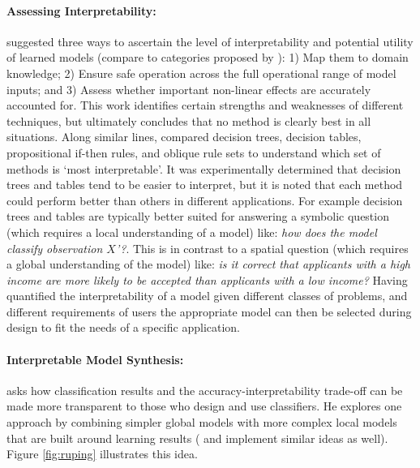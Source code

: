\paragraph{Assessing Interpretability:}
\citet{Van_Belle2013-ph} suggested three ways to ascertain the level of interpretability and potential utility of learned models (compare to categories proposed by \citet{Lipton2016-ug}): 1) Map them to domain knowledge; 2) Ensure safe operation across the full operational range of model inputs; and 3) Assess whether important non-linear effects are accurately accounted for. This work identifies certain strengths and weaknesses of different techniques, but ultimately concludes that no method is clearly best in all situations. 
%
Along similar lines, \citet{Huysmans2011-th} compared decision trees, decision tables, propositional if-then rules, and oblique rule sets to understand which set of methods is `most interpretable'. It was experimentally determined that decision trees and tables tend to be easier to interpret, but it is noted that each method could perform better than others in different applications. For example decision trees and tables are typically better suited for answering a symbolic question (which requires a local understanding of a model) like: \emph{how does the model classify observation $X$'?}. This is in contrast to a spatial question (which requires a global understanding of the model) like: \emph{is it correct that applicants with a high income are more likely to be accepted than applicants with a low income?}
%
Having quantified the interpretability of a model given different classes of problems, and different requirements of users the appropriate model can then be selected during design to fit the needs of a specific application.

\paragraph{Interpretable Model Synthesis:}
\citet{Ruping2006-xj} asks how classification results and the accuracy-interpretability trade-off can be made more transparent to those who design and use classifiers. He explores one approach by combining simpler global models with more complex local models that are built around learning results (\citet{Otte2013-oo} and \citet{Ribeiro2016-uc} implement similar ideas as well). Figure \ref{fig:ruping} illustrates this idea. 

